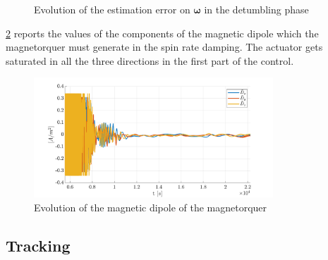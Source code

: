 \begin{figure}[h!]
    \centering
    \caption{Evolution of the estimation error on $\bm{\omega}$ in the detumbling phase}
    \label{fig:detumbling-estW}
\end{figure}

\cref{fig:detumblingSRD-D} reports the values of the components of the magnetic dipole which the magnetorquer must generate in the spin rate damping. The actuator gets saturated in all the three directions in the first part of the control.

\begin{figure}[h!]
    \centering
    \includegraphics[width=0.8\textwidth]{graphics/detumbling-SRD/detumblingSRD-D.pdf}
    \caption{Evolution of the magnetic dipole of the magnetorquer}
    \label{fig:detumblingSRD-D}
\end{figure}

\subsection{Tracking}

